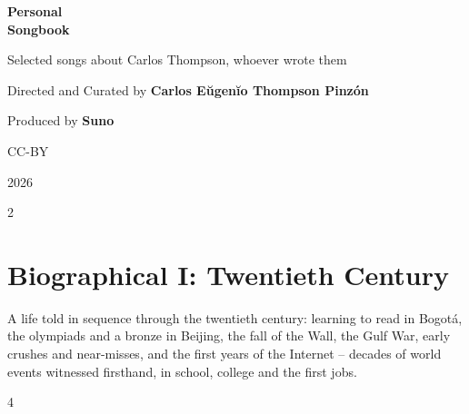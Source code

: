 \documentclass[a4paper,landscape]{memoir}
\begin{document}
\frontmatter
{}

\begin{titlingpage}
\centering
\vspace*{\fill}
{\LARGE\bfseries Personal\\\Huge Songbook\par}
\bigskip
{\large Selected songs about Carlos Thompson, whoever wrote them\par}
\vspace*{\fill}
{\normalsize Directed and Curated by \bfseries Carlos Eŭgenĭo Thompson Pinzón\par}
{\normalsize Produced by \bfseries Suno\par}
\bigskip
{\normalsize CC-BY\par}
{\normalsize 2026\par}
\vspace*{\fill}
\end{titlingpage}

\clearpage\begin{multicols*}{2}
\tableofcontents*
\end{multicols*}
\mainmatter
\renewcommand\chaptername{Album~}

\chapter{Biographical I: Twentieth Century}
A life told in sequence through the twentieth century: learning to read in Bogotá, the olympiads and a bronze in Beijing, the fall of the Wall, the Gulf War, early crushes and near-misses, and the first years of the Internet -- decades of world events witnessed firsthand, in school, college and the first jobs.
\clearpage\begin{multicols*}{4}
















\end{multicols*}
\end{document}
